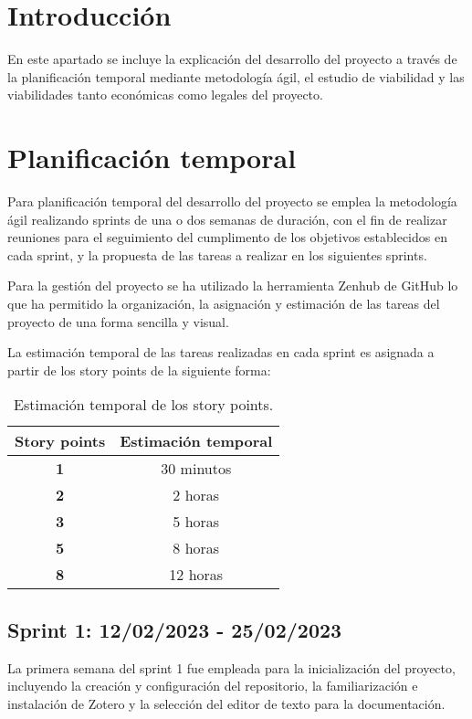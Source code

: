 
\section{Introducción}
En este apartado se incluye la explicación del desarrollo del proyecto a través de la planificación temporal mediante metodología ágil, el estudio de viabilidad y las viabilidades tanto económicas como legales del proyecto.

\section{Planificación temporal}
Para planificación temporal del desarrollo del proyecto se emplea la metodología ágil realizando sprints de una o dos semanas de duración, con el fin de realizar reuniones para el seguimiento del cumplimento de los objetivos establecidos en cada sprint, y la propuesta de las tareas a realizar en los siguientes sprints.

Para la gestión del proyecto se ha utilizado la herramienta Zenhub de GitHub lo que ha permitido la organización, la asignación y estimación de las tareas del proyecto de una forma sencilla y visual.

La estimación temporal de las tareas realizadas en cada sprint es asignada a partir de los story points de la siguiente forma:

\begin{table}[ht!]
    \centering
    \resizebox{8cm}{!} {
    \begin{tabular}{|c|c|}
    \hline
    \rowcolor[rgb]{0.99,0.93,0.93}
    \textbf{Story points}   & \textbf{Estimación temporal} \\ \hline
    \textbf{1}              & 30 minutos \\ \hline 
    \textbf{2}              &  2 horas \\ \hline
    \textbf{3}              &  5 horas \\ \hline 
    \textbf{5}              &  8 horas \\ \hline 
    \textbf{8}              & 12 horas \\ \hline 
   
    \end{tabular}}
    \caption{Estimación temporal de los story points.}
    \label{tab:my_label}
\end{table}

\subsection{Sprint 1: 12/02/2023 - 25/02/2023}
La primera semana del sprint 1 fue empleada para la inicialización del proyecto, incluyendo la creación y configuración del repositorio, la familiarización e instalación de Zotero y la selección del editor de texto para la documentación. 

